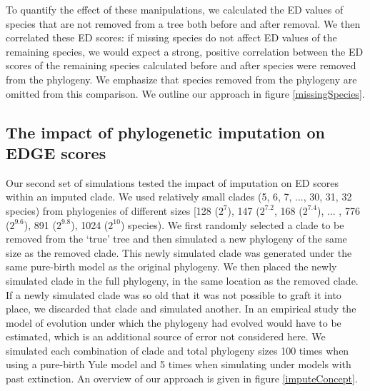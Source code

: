 \documentclass[10pt,english]{article}
\begin{document}
To quantify the effect of these manipulations, we calculated the ED values of
species that are not removed from a tree both before and after removal. We then
correlated these ED scores: if missing species do not affect ED values of the
remaining species, we would expect a strong, positive correlation between the ED
scores of the remaining species calculated before and after species were removed
from the phylogeny. We emphasize that species removed from the phylogeny are
omitted from this comparison. We outline our approach in figure
\ref{missingSpecies}.

\subsection*{The impact of phylogenetic imputation on EDGE scores}
Our second set of simulations tested the impact of imputation on ED scores
within an imputed clade. We used relatively small clades (5, 6, 7, ..., 30, 31,
32 species) from phylogenies of different sizes [128 ($2^7$), 147 ($2^{7.2}$,
168 ($2^{7.4}$), ... , 776 ($2^{9.6}$), 891 ($2^{9.8}$), 1024 ($2^{10}$)
species). We first randomly selected a clade to be removed from the ‘true' tree
and then simulated a new phylogeny of the same size as the removed clade. This
newly simulated clade was generated under the same pure-birth model as the
original phylogeny. We then placed the newly simulated clade in the full
phylogeny, in the same location as the removed clade. If a newly simulated clade
was so old that it was not possible to graft it into place, we discarded that
clade and simulated another. In an empirical study the model of evolution under
which the phylogeny had evolved would have to be estimated, which is an
additional source of error not considered here. We simulated each combination of
clade and total phylogeny sizes 100 times when using a pure-birth Yule
model and 5 times when simulating under models with past extinction. An
overview of our approach is given in figure \ref{imputeConcept}. 
\end{document}
